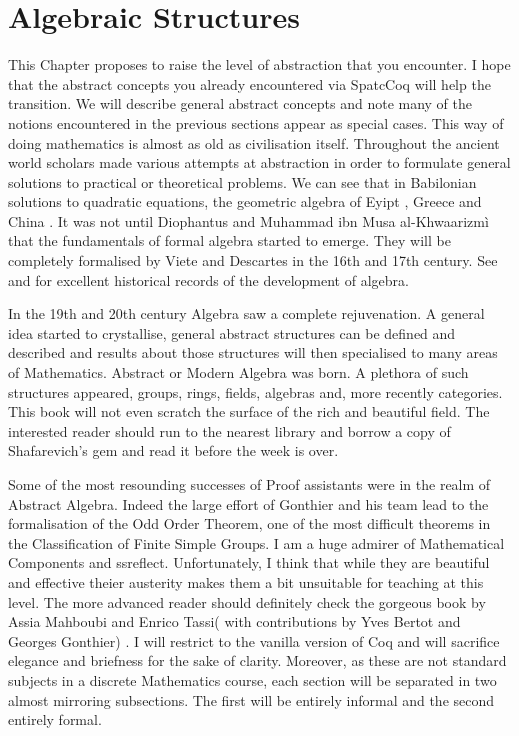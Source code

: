 \chapter{Algebraic Structures}\label{ch:algstr}

This Chapter proposes to raise the level of abstraction that you encounter. I hope that  the abstract concepts you already encountered via SpatcCoq will help the transition. We will describe general abstract concepts and note  many of the notions encountered in the previous sections appear as special cases. This way of doing mathematics is almost as old as civilisation itself. Throughout the ancient world scholars made various attempts at abstraction in order to formulate general solutions to practical or theoretical problems. We can see that in Babilonian solutions to quadratic equations\cite{Robson:2002aa}, the geometric algebra of Eyipt   \cite{robins1987rhind}, Greece \cite{Euclid:2002aa} and China \cite{abbott_2001}. It was not until Diophantus and Muhammad ibn Musa al-Khwaarizm\`i that the fundamentals of formal algebra started to emerge. They will be completely formalised by Viete and Descartes in the 16th and 17th century. See \cite{Shell-Gellasch:2015aa} and \cite{Waerden:1983aa} for excellent historical records of the development of algebra.

In the 19th and 20th century Algebra saw a complete rejuvenation. A general idea started to crystallise, general abstract structures can be defined and described and results about those structures  will then specialised to many areas of Mathematics. Abstract or Modern Algebra was born. A plethora of such structures appeared, groups, rings, fields, algebras and, more recently categories. This book will not even scratch  the surface of the rich and beautiful field. The interested reader should run to the nearest library and borrow a copy of Shafarevich's gem \cite{Shafarevich:2006aa} and read it before the week is over.

Some of the most resounding successes of Proof assistants were in the realm of Abstract Algebra. Indeed the large effort of Gonthier  and his team lead to the formalisation of the Odd Order Theorem, one of the most difficult theorems in the Classification of Finite Simple Groups. I am a huge admirer of Mathematical Components and ssreflect. Unfortunately, I think that while they are  beautiful and effective theier austerity makes them a bit unsuitable for teaching at this level. The more advanced reader should definitely check the gorgeous book by Assia Mahboubi and Enrico Tassi( with contributions by Yves Bertot and Georges Gonthier) \cite{MathComp}. I will restrict to the vanilla version of Coq and will sacrifice elegance and briefness for the sake of clarity. Moreover, as these are not standard subjects in a discrete Mathematics course, each section will be separated in two almost mirroring subsections. The first will be entirely informal and the second entirely formal.

